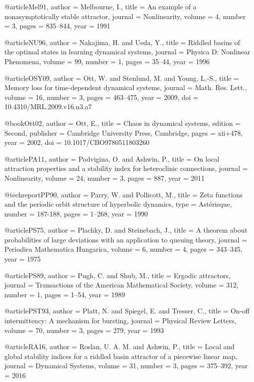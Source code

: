 @article{Mel91,
  author = {Melbourne, I.},
  title = {An example of a nonasymptotically stable attractor},
  journal = {Nonlinearity},
  volume = {4},
  number = {3},
  pages = {835--844},
  year = {1991}
}

@article{NU96,
  author = {Nakajima, H. and Ueda, Y.},
  title = {Riddled basins of the optimal states in learning dynamical systems},
  journal = {Physica D: Nonlinear Phenomena},
  volume = {99},
  number = {1},
  pages = {35--44},
  year = {1996}
}

@article{OSY09,
  author = {Ott, W. and Stenlund, M. and Young, L.-S.},
  title = {Memory loss for time-dependent dynamical systems},
  journal = {Math. Res. Lett.},
  volume = {16},
  number = {3},
  pages = {463--475},
  year = {2009},
  doi = {10.4310/MRL.2009.v16.n3.a7}
}

@book{Ott02,
  author = {Ott, E.},
  title = {Chaos in dynamical systems},
  edition = {Second},
  publisher = {Cambridge University Press, Cambridge},
  pages = {xii+478},
  year = {2002},
  doi = {10.1017/CBO9780511803260}
}

@article{PA11,
  author = {Podvigina, O. and Ashwin, P.},
  title = {On local attraction properties and a stability index for heteroclinic connections},
  journal = {Nonlinearity},
  volume = {24},
  number = {3},
  pages = {887},
  year = {2011}
}

@techreport{PP90,
  author = {Parry, W. and Pollicott, M.},
  title = {Zeta functions and the periodic orbit structure of hyperbolic dynamics},
  type = {Ast{\'e}risque},
  number = {187-188},
  pages = {1--268},
  year = {1990}
}

@article{PS75,
  author = {Plachky, D. and Steinebach, J.},
  title = {A theorem about probabilities of large deviations with an application to queuing theory},
  journal = {Periodica Mathematica Hungarica},
  volume = {6},
  number = {4},
  pages = {343--345},
  year = {1975}
}

@article{PS89,
  author = {Pugh, C. and Shub, M.},
  title = {Ergodic attractors},
  journal = {Transactions of the American Mathematical Society},
  volume = {312},
  number = {1},
  pages = {1--54},
  year = {1989}
}

@article{PST93,
  author = {Platt, N. and Spiegel, E. and Tresser, C.},
  title = {On-off intermittency: A mechanism for bursting},
  journal = {Physical Review Letters},
  volume = {70},
  number = {3},
  pages = {279},
  year = {1993}
}

@article{RA16,
  author = {Roslan, U. A. M. and Ashwin, P.},
  title = {Local and global stability indices for a riddled basin attractor of a piecewise linear map},
  journal = {Dynamical Systems},
  volume = {31},
  number = {3},
  pages = {375--392},
  year = {2016}
}

